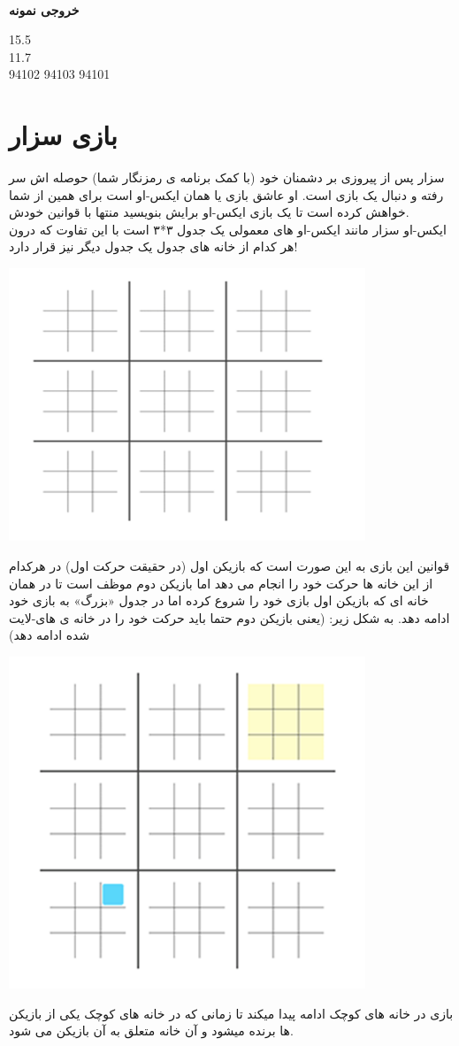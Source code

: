 \documentclass[]{article}
\newcommand{\outputsample}[1]{
    ~\\
    \textbf{خروجی نمونه}

    \begin{tcolorbox}[breakable,boxrule=0pt]
        \begin{latin}
            \large{
                #1
            }
        \end{latin}
    \end{tcolorbox}
}
\begin{document}
\outputsample{
15.5\\
11.7\\
94102 94103 94101 	
}
\newpage
\section{‌بازی سزار}
سزار پس از پیروزی بر دشمنان خود (با کمک برنامه ی رمزنگار شما) حوصله اش سر رفته و دنبال یک بازی است. او عاشق بازی  یا همان ایکس-او است برای همین از شما خواهش کرده است تا یک بازی ایکس-او برایش بنویسید منتها با قوانین خودش.\\
ایکس-او سزار مانند ایکس-او های معمولی یک جدول ۳*۳ است با این تفاوت که درون هر کدام از خانه های جدول یک جدول دیگر نیز قرار دارد!\\
\begin{center}
	\includegraphics[width=0.8\textwidth ]{cezar1.png}
\end{center}
\newpage
قوانین این بازی به این صورت است که بازیکن اول (در حقیقت حرکت اول) در هرکدام از این خانه ها حرکت خود را انجام می دهد اما بازیکن دوم موظف است تا در همان خانه ای که بازیکن اول بازی خود را شروع کرده اما در جدول «بزرگ» به بازی خود ادامه دهد. به شکل زیر: (یعنی بازیکن دوم حتما باید حرکت خود را در خانه ی های-لایت شده ادامه دهد)\\
\begin{center}
	\includegraphics[width=0.8\textwidth ]{cezar2.png}
\end{center}
\newpage
بازی در خانه های کوچک ادامه پیدا میکند تا زمانی که در خانه های کوچک یکی از بازیکن ها برنده میشود و آن خانه متعلق به آن بازیکن می شود.\\
\end{document}
